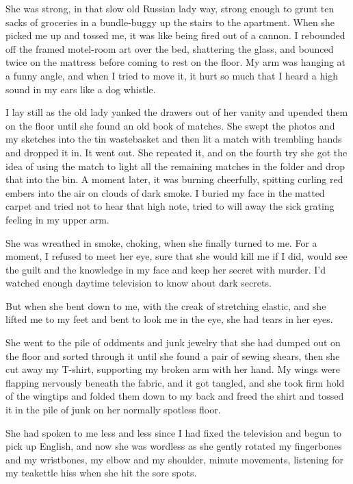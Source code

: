 \documentclass{article}
\begin{document}
She was strong, in that slow old Russian lady way, strong enough to
grunt ten sacks of groceries in a bundle-buggy up the stairs to the
apartment.  When she picked me up and tossed me, it was like being
fired out of a cannon.  I rebounded off the framed motel-room art over
the bed, shattering the glass, and bounced twice on the mattress
before coming to rest on the floor.  My arm was hanging at a funny
angle, and when I tried to move it, it hurt so much that I heard a
high sound in my ears like a dog whistle.

I lay still as the old lady yanked the drawers out of her vanity and
upended them on the floor until she found an old book of matches.  She
swept the photos and my sketches into the tin wastebasket and then lit
a match with trembling hands and dropped it in.  It went out.  She
repeated it, and on the fourth try she got the idea of using the match
to light all the remaining matches in the folder and drop that into
the bin.  A moment later, it was burning cheerfully, spitting curling
red embers into the air on clouds of dark smoke.  I buried my face in
the matted carpet and tried not to hear that high note, tried to will
away the sick grating feeling in my upper arm.

She was wreathed in smoke, choking, when she finally turned to me. 
For a moment, I refused to meet her eye, sure that she would kill me
if I did, would see the guilt and the knowledge in my face and keep
her secret with murder.  I'd watched enough daytime television to know
about dark secrets.

But when she bent down to me, with the creak of stretching elastic,
and she lifted me to my feet and bent to look me in the eye, she had
tears in her eyes.

She went to the pile of oddments and junk jewelry that she had dumped
out on the floor and sorted through it until she found a pair of
sewing shears, then she cut away my T-shirt, supporting my broken arm
with her hand.  My wings were flapping nervously beneath the fabric,
and it got tangled, and she took firm hold of the wingtips and folded
them down to my back and freed the shirt and tossed it in the pile of
junk on her normally spotless floor.

She had spoken to me less and less since I had fixed the television
and begun to pick up English, and now she was wordless as she gently
rotated my fingerbones and my wristbones, my elbow and my shoulder,
minute movements, listening for my teakettle hiss when she hit the
sore spots.
\end{document}
